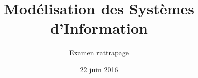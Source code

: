 \title{
   Modélisation des Systèmes d'Information
}
\author{
	Examen rattrapage
}
\date{22 juin 2016}

